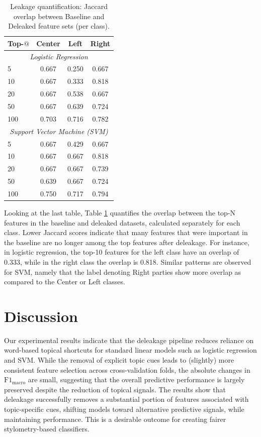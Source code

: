 \documentclass[11pt]{article}
\begin{document}
\begin{table}[t]
\centering
\label{tab:leakage_quantification_stacked}
\begin{tabular}{lccc}
\hline
\textbf{Top-$@$} & \textbf{Center} & \textbf{Left} & \textbf{Right} \\
\hline
\multicolumn{4}{c}{\textit{Logistic Regression}} \\
\hline
5   & 0.667 & 0.250 & 0.667 \\
10  & 0.667 & 0.333 & 0.818 \\
20  & 0.667 & 0.538 & 0.667 \\
50  & 0.667 & 0.639 & 0.724 \\
100 & 0.703 & 0.716 & 0.782 \\
\hline
\multicolumn{4}{c}{\textit{Support Vector Machine (SVM)}} \\
\hline
5   & 0.667 & 0.429 & 0.667 \\
10  & 0.667 & 0.667 & 0.818 \\
20  & 0.667 & 0.667 & 0.739 \\
50  & 0.639 & 0.667 & 0.724 \\
100 & 0.750 & 0.717 & 0.794 \\
\hline
\end{tabular}
\caption{Leakage quantification: Jaccard overlap between Baseline and Deleaked feature sets (per class).}
\end{table}

Looking at the last table, Table \ref{tab:leakage_quantification_stacked} quantifies the overlap between the top-N features in the baseline and deleaked datasets, calculated separately for each class. Lower Jaccard scores indicate that many features that were important in the baseline are no longer among the top features after deleakage. For instance, in logistic regression, the top-10 features for the left class have an overlap of 0.333, while in the right class the overlap is 0.818. Similar patterns are observed for SVM, namely that the label denoting Right parties show more overlap as compared to the Center or Left classes.

\section{Discussion}
Our experimental results indicate that the deleakage pipeline reduces reliance on word-based topical shortcuts for standard linear models such as logistic regression and SVM. While the removal of explicit topic cues leads to (slightly) more consistent feature selection across cross-validation folds, the absolute changes in $\mathrm{F1}_{\text{macro}}$ are small, suggesting that the overall predictive performance is largely preserved despite the reduction of topical signals. The results show that deleakage successfully removes a substantial portion of features associated with topic-specific cues, shifting models toward alternative predictive signals, while maintaining performance. This is a desirable outcome for creating fairer stylometry-based classifiers.
\end{document}
